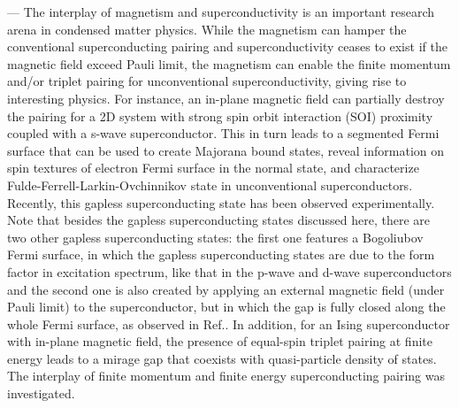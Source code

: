 \documentclass[aps, prb, twocolumn, amssymb, amsmath, showpacs, superscriptaddress]{revtex4-1}
\begin{document}
\maketitle

 --- The interplay of magnetism and superconductivity is an important research arena in condensed matter physics\cite{RMP1, RMP2, RMP3}. While the magnetism can hamper the conventional superconducting pairing and superconductivity ceases to exist if the magnetic field exceed Pauli limit\cite{Clogston},
the magnetism can enable the finite momentum and/or triplet pairing for unconventional superconductivity, giving rise to interesting physics. For instance, an in-plane magnetic field can partially destroy the pairing
for a 2D system with strong spin orbit interaction (SOI) proximity coupled with a s-wave superconductor. This in turn leads to a segmented Fermi surface that can be used to create Majorana bound states, reveal information on spin textures of electron Fermi surface in the normal state, and characterize Fulde-Ferrell-Larkin-Ovchinnikov state in unconventional superconductors\cite{L-Fu1, L-Fu3, L-Fu2}. Recently, this gapless superconducting state has been observed experimentally\cite{L-Fu2}.
Note that besides the gapless superconducting states discussed here,
there are two other gapless superconducting states:
the first one features a Bogoliubov Fermi surface,
in which the gapless superconducting states are due to the form factor in excitation spectrum,
like that in the p-wave and d-wave superconductors \cite{Agterberg, Brydon, Sim}
and the second one is also created by applying an external magnetic field (under Pauli limit) to the superconductor,
but in which the gap is fully closed along the whole Fermi surface, as observed in Ref..
In addition, for an Ising superconductor\cite{KT-Law1, J-Lu, X-Xi, Y-Saito, QF-Sun1, QF-Sun2} with in-plane magnetic field, the presence of equal-spin triplet pairing at finite energy leads to a mirage gap that coexists with quasi-particle density of states\cite{GM-Tang,GM-Tang1}.
The interplay of finite momentum and finite energy superconducting pairing was investigated\cite{Chakraborty}.
\end{document}
